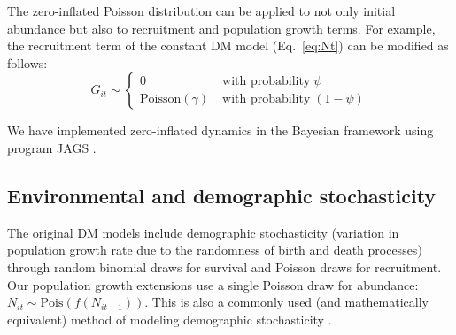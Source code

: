 \documentclass[12pt]{article}
\begin{document}
The zero-inflated Poisson distribution can be applied to not only
initial abundance but also to recruitment and population growth
terms. For example, the recruitment term of the constant DM model
(Eq.~\ref{eq:Nt}) can be modified as follows:
\begin{equation}
G_{it} \sim \left\{
\begin{aligned}
0 &\; \text{with probability} \; \psi \\
\mathrm{Poisson}(\gamma) &\; \text{with probability} \; (1-\psi)\end{aligned} \right.
\label{eq:ZIPts}
\end{equation}

We have implemented
zero-inflated dynamics in the Bayesian framework using program
\textrm{JAGS} \citep[version 3.2.0]{plummer:2003}.


\subsection{Environmental and demographic stochasticity}

The original DM models include demographic stochasticity (variation in population growth 
rate due to the randomness of birth and death processes) through random 
binomial draws for survival and Poisson draws for recruitment.  Our population
growth extensions use a single Poisson draw for abundance: $N_{it} \sim 
\text{Pois}(f(N_{it-1}))$.  This is also a commonly used (and mathematically equivalent) 
method of modeling demographic stochasticity 
\citep{bonsall_hastings:2004,melbourne_hastings:2008}.  
\end{document}

